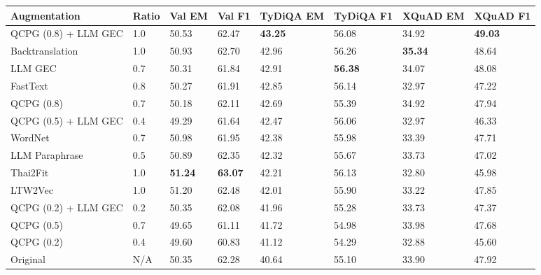 \begin{tabular}{llllllll}
\toprule
Augmentation & Ratio & Val EM & Val F1 & TyDiQA EM & TyDiQA F1 & XQuAD EM & XQuAD F1 \\
\midrule
QCPG (0.8) + LLM GEC & 1.0 & 50.53 & 62.47 & \textbf{43.25} & 56.08 & 34.92 & \textbf{49.03} \\
Backtranslation & 1.0 & 50.93 & 62.70 & 42.96 & 56.26 & \textbf{35.34} & 48.64 \\
LLM GEC & 0.7 & 50.31 & 61.84 & 42.91 & \textbf{56.38} & 34.07 & 48.08 \\
FastText & 0.8 & 50.27 & 61.91 & 42.85 & 56.14 & 32.97 & 47.22 \\
QCPG (0.8) & 0.7 & 50.18 & 62.11 & 42.69 & 55.39 & 34.92 & 47.94 \\
QCPG (0.5) + LLM GEC & 0.4 & 49.29 & 61.64 & 42.47 & 56.06 & 32.97 & 46.33 \\
WordNet & 0.7 & 50.98 & 61.95 & 42.38 & 55.98 & 33.39 & 47.71 \\
LLM Paraphrase & 0.5 & 50.89 & 62.35 & 42.32 & 55.67 & 33.73 & 47.02 \\
Thai2Fit & 1.0 & \textbf{51.24} & \textbf{63.07} & 42.21 & 56.13 & 32.80 & 45.98 \\
LTW2Vec & 1.0 & 51.20 & 62.48 & 42.01 & 55.90 & 33.22 & 47.85 \\
QCPG (0.2) + LLM GEC & 0.2 & 50.35 & 62.08 & 41.96 & 55.28 & 33.73 & 47.37 \\
QCPG (0.5) & 0.7 & 49.65 & 61.11 & 41.72 & 54.98 & 33.98 & 47.68 \\
QCPG (0.2) & 0.4 & 49.60 & 60.83 & 41.12 & 54.29 & 32.88 & 45.60 \\
Original & N/A & 50.35 & 62.28 & 40.64 & 55.10 & 33.90 & 47.92 \\
\bottomrule
\end{tabular}
